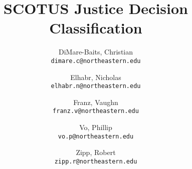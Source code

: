 \documentclass[a4paper, 11pt]{article}
\title{SCOTUS Justice Decision Classification}
\author{
  DiMare-Baits, Christian\\
  \texttt{dimare.c@northeastern.edu}
  \and
  Elhabr, Nicholas\\
  \texttt{elhabr.n@northeastern.edu}
  \and
  Franz, Vaughn\\
  \texttt{franz.v@northeastern.edu}
  \and
  Vo, Phillip\\
  \texttt{vo.p@northeastern.edu}
  \and
  Zipp, Robert\\
  \texttt{zipp.r@northeastern.edu}
}
\date{}
\begin{document}
\maketitle

\nocite{*}
\printbibliography{}
\end{document}
